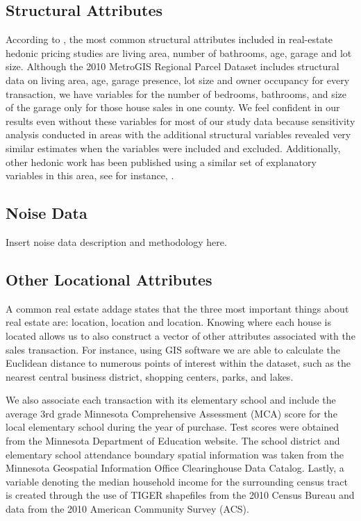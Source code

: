 \documentclass{article}\usepackage{graphicx, color}
\begin{document}
\subsection{Structural Attributes}
According to \cite{Wilhelmsson2000}, the most common structural attributes included in real-estate hedonic pricing studies are living area, number of bathrooms, age, garage and lot size.  Although the 2010 MetroGIS Regional Parcel Dataset includes structural data on living area, age, garage presence, lot size and owner occupancy for every transaction, we have variables for the number of bedrooms, bathrooms, and size of the garage only for those house sales in one county. We feel confident in our results even without these variables for most of our study data because sensitivity analysis conducted in areas with the additional structural variables revealed very similar estimates when the variables were included and excluded. Additionally, other hedonic work has been published using a similar set of explanatory variables in this area, see for instance, \citet{Sander2009b}.

\subsection{Noise Data}
Insert noise data description and methodology here. \citet{Nega2012}

\subsection{Other Locational Attributes}
A common real estate addage states that the three most important things about real estate are: location, location and location. Knowing where each house is located allows us to also construct a vector of other attributes associated with the sales transaction. For instance, using GIS software we are able to calculate the Euclidean distance to numerous points of interest within the dataset, such as the nearest central business district, shopping centers, parks, and lakes. 

We also associate each transaction with its elementary school and include the average 3rd grade Minnesota Comprehensive Assessment (MCA) score for the local elementary school during the year of purchase. Test scores were obtained from the Minnesota Department of Education website. The school district and elementary school attendance boundary spatial information was taken from the Minnesota Geospatial Information Office Clearinghouse Data Catalog. Lastly, a variable denoting the median household income for the surrounding census tract is created through the use of TIGER shapefiles from the 2010 Census Bureau and data from the 2010 American Community Survey (ACS). 
\end{document}
